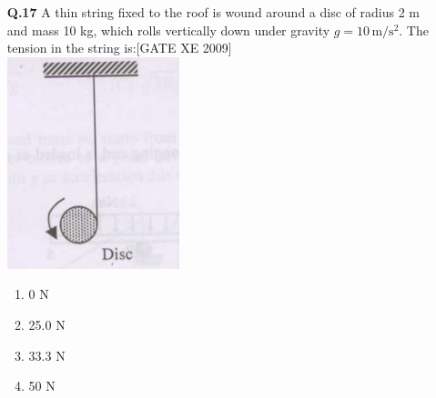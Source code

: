 \documentclass[journal,12pt,onecolumn]{IEEEtran}
\theoremstyle{remark}
\begin{document}
\begin{enumerate}
\begin{enumerate}
\vspace{0.3cm}

\item[\textbf{Q.17}] A thin string fixed to the roof is wound around a disc of radius 2 m and mass 10 kg, which rolls vertically down under gravity $g=10\,\mathrm{m/s^2}$. The tension in the string is:\hfill[GATE XE 2009]\\


    \includegraphics[width=0.5\columnwidth]{figs/fig19.png}
    

\begin{multicols}{2}
\begin{enumerate}
    \item 0 N
    \item 25.0 N
    \item 33.3 N
    \item 50 N
\end{enumerate}
\end{multicols}


\vspace{0.3cm}


\end{enumerate}
\end{enumerate}
\end{document}
